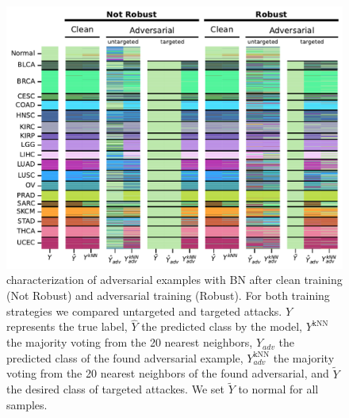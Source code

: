 \documentclass[../main.tex]{subfiles}
\begin{document}
		\begin{figure}[htbp]
			\centering
			\includegraphics[width=\textwidth]{MLP_BN_knn_comparison.pdf}
			\caption[ characterization of adversarial examples with  BN]{ characterization of adversarial examples with  BN after clean training (Not Robust) and adversarial training (Robust). For both training strategies we compared untargeted and targeted attacks. \(Y\) represents the true label, \(\hat{Y}\) the predicted class by the model, \(Y^{\text{kNN}}\) the majority voting from the 20 nearest neighbors, \(\hat{Y}_{adv}\) the predicted class of the found adversarial example, \(Y^{\text{kNN}}_{adv}\) the majority voting from the 20 nearest neighbors of the found adversarial, and \(\tilde{Y}\) the desired class of targeted attackes. We set \(\tilde{Y}\) to normal for all samples.}\label{fig:mlp_bn_knn_comp}
		\end{figure}
\end{document}
